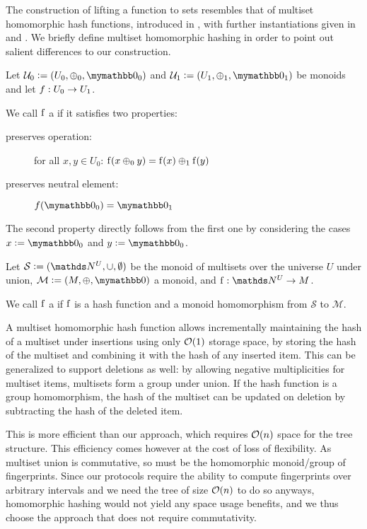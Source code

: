 The construction of lifting a function to sets resembles that of multiset homomorphic hash functions, introduced in \cite{clarke2003incremental}, with further instantiations given in \cite{cathalo2009comparing} and \cite{maitin2017elliptic}. We briefly define multiset homomorphic hashing in order to point out salient differences to our construction.

\begin{definition}
Let $\mathcal{U}_0 \defeq (U_0, \groupaddsym_0, \neutraladd_0)$ and $\mathcal{U}_1 \defeq (U_1, \groupaddsym_1, \neutraladd_1)$ be monoids and let ${f}: {U_0} \rightarrow {U_1}$.

We call $\operatorname{f}$ a  if it satisfies two properties:

\begin{description}
  \item[preserves operation:] for all $x, y \in U_0$: $\operatorname{f}(x \oplus_0 y) = \operatorname{f}(x) \oplus_1 \operatorname{f}(y)$
  \item[preserves neutral element:] $f(\neutraladd_0) = \neutraladd_1$
\end{description}

The second property directly follows from the first one by considering the cases $x \defeq \neutraladd_0$ and $y \defeq \neutraladd_0$.
\end{definition}

\begin{definition}
Let $\mathcal{S} \defeq (\N^U, \cup, \emptyset)$ be the monoid of multisets over the universe $U$ under union, $\mathcal{M} \defeq (M, \groupaddsym, \neutraladd)$ a monoid, and $\fun{\f}{\N^U}{M}$.

We call $\operatorname{f}$ a  if $\operatorname{f}$ is a hash function and a monoid homomorphism from $\mathcal{S}$ to $\mathcal{M}$.
\end{definition}

A multiset homomorphic hash function allows incrementally maintaining the hash of a multiset under insertions using only $\mathcal{O}(1)$ storage space, by storing the hash of the multiset and combining it with the hash of any inserted item. This can be generalized to support deletions as well: by allowing negative multiplicities for multiset items, multisets form a group under union. If the hash function is a group homomorphism, the hash of the multiset can be updated on deletion by subtracting the hash of the deleted item.

This is more efficient than our approach, which requires $\mathcal{O}(n)$ space for the tree structure. This efficiency comes however at the cost of loss of flexibility. As multiset union is commutative, so must be the homomorphic monoid/group of fingerprints. Since our protocols require the ability to compute fingerprints over arbitrary intervals and we need the tree of size $\mathcal{O}(n)$ to do so anyways, homomorphic hashing would not yield any space usage benefits, and we thus choose the approach that does not require commutativity.


